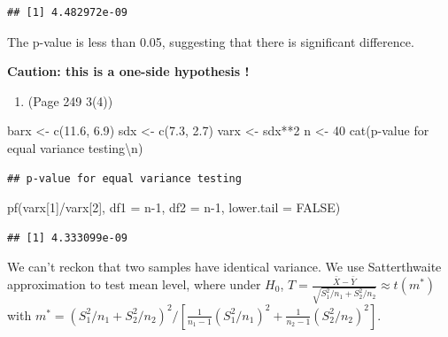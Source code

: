 \documentclass{article}
\newenvironment{Shaded}{\begin{snugshade}}{\end{snugshade}}
\newcommand{\AttributeTok}[1]{\textcolor[rgb]{0.77,0.63,0.00}{#1}}
\newcommand{\ConstantTok}[1]{\textcolor[rgb]{0.00,0.00,0.00}{#1}}
\newcommand{\DecValTok}[1]{\textcolor[rgb]{0.00,0.00,0.81}{#1}}
\newcommand{\FloatTok}[1]{\textcolor[rgb]{0.00,0.00,0.81}{#1}}
\newcommand{\FunctionTok}[1]{\textcolor[rgb]{0.00,0.00,0.00}{#1}}
\newcommand{\NormalTok}[1]{#1}
\newcommand{\OtherTok}[1]{\textcolor[rgb]{0.56,0.35,0.01}{#1}}
\newcommand{\SpecialCharTok}[1]{\textcolor[rgb]{0.00,0.00,0.00}{#1}}
\newcommand{\StringTok}[1]{\textcolor[rgb]{0.31,0.60,0.02}{#1}}
\begin{document}
\begin{verbatim}
## [1] 4.482972e-09
\end{verbatim}

The p-value is less than 0.05, suggesting that there is significant
difference.

\textbf{Caution: this is a one-side hypothesis !}

\begin{enumerate}
\def\labelenumi{\arabic{enumi}.}
\setcounter{enumi}{2}
\tightlist
\item
  (Page 249 3(4))
\end{enumerate}

\begin{Shaded}
\begin{Highlighting}[]
\NormalTok{barx }\OtherTok{\textless{}{-}} \FunctionTok{c}\NormalTok{(}\FloatTok{11.6}\NormalTok{, }\FloatTok{6.9}\NormalTok{)}
\NormalTok{sdx }\OtherTok{\textless{}{-}} \FunctionTok{c}\NormalTok{(}\FloatTok{7.3}\NormalTok{, }\FloatTok{2.7}\NormalTok{)}
\NormalTok{varx }\OtherTok{\textless{}{-}}\NormalTok{ sdx}\SpecialCharTok{**}\DecValTok{2}
\NormalTok{n }\OtherTok{\textless{}{-}} \DecValTok{40}
\FunctionTok{cat}\NormalTok{(}\StringTok{\textquotesingle{}p{-}value for equal variance testing}\SpecialCharTok{\textbackslash{}n}\StringTok{\textquotesingle{}}\NormalTok{)}
\end{Highlighting}
\end{Shaded}

\begin{verbatim}
## p-value for equal variance testing
\end{verbatim}

\begin{Shaded}
\begin{Highlighting}[]
\FunctionTok{pf}\NormalTok{(varx[}\DecValTok{1}\NormalTok{]}\SpecialCharTok{/}\NormalTok{varx[}\DecValTok{2}\NormalTok{], }\AttributeTok{df1 =}\NormalTok{ n}\DecValTok{{-}1}\NormalTok{, }\AttributeTok{df2 =}\NormalTok{ n}\DecValTok{{-}1}\NormalTok{, }\AttributeTok{lower.tail =} \ConstantTok{FALSE}\NormalTok{)}
\end{Highlighting}
\end{Shaded}

\begin{verbatim}
## [1] 4.333099e-09
\end{verbatim}

We can't reckon that two samples have identical variance. We use
Satterthwaite approximation to test mean level, where under \(H_0\),
\(T = \frac{\bar{X} -\bar{Y}}{\sqrt{S_1^2/n_1 + S_2^2/n_2}} \approx t(m^{*})\)
with
\(m^{*} = (S_1^2/n_1 + S_2^2/n_2)^2/[\frac{1}{n_1 - 1}(S_1^2/n_1)^2 + \frac{1}{n_2 - 1}(S_2^2/n_2)^2]\).
\end{document}
